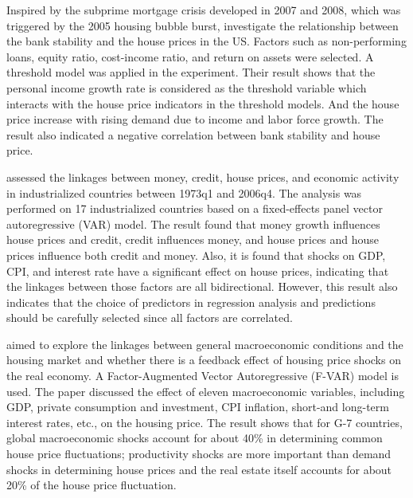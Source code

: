 \documentclass[11pt]{article}
\begin{document}
Inspired by the subprime mortgage crisis developed in 2007 and 2008, which was triggered by the 2005 housing bubble burst, \citet{PAN20131720} investigate the relationship between the bank stability and the house prices in the US. Factors such as non-performing loans, equity ratio, cost-income ratio, and return on assets were selected. A threshold model was applied in the experiment. Their result shows that the personal income growth rate is considered as the threshold variable which interacts with the house price indicators in the threshold models. And the house price increase with rising demand due to income and labor force growth. The result also indicated a negative correlation between bank stability and house price.

\citet{10.2307/23606731} assessed the linkages between money, credit, house prices, and economic activity in industrialized countries between 1973q1 and 2006q4. The analysis was performed on 17 industrialized countries based on a fixed-effects panel vector autoregressive (VAR) model. The result found that money growth influences house prices and credit, credit influences money, and house prices and house prices influence both credit and money. Also, it is found that shocks on GDP, CPI, and interest rate have a significant effect on house prices, indicating that the linkages between those factors are all bidirectional. However, this result also indicates that the choice of predictors in regression analysis and predictions should be carefully selected since all factors are correlated.

\citet{BELTRATTI2010533} aimed to explore the linkages between general macroeconomic conditions and the housing market and whether there is a feedback effect of housing price shocks on the real economy. A Factor-Augmented Vector Autoregressive (F-VAR) model is used. The paper discussed the effect of eleven macroeconomic variables, including GDP, private consumption and investment, CPI inflation, short-and long-term interest rates, etc., on the housing price. The result shows that for G-7 countries, global macroeconomic shocks account for about 40\% in determining common house price fluctuations; productivity shocks are more important than demand shocks in determining house prices and the real estate itself accounts for about 20\% of the house price fluctuation.
\end{document}
